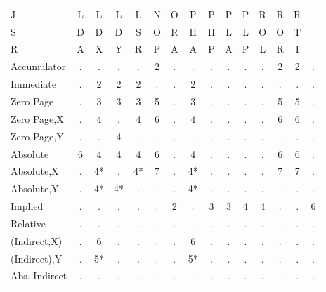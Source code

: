 \documentclass{article}
\begin{document}
  \begin{table}[H]
  \centering
  \begin{tabular}{|l|c c c c c c c c c c c c c c|}
  \hline
                  J & L & L & L & L & N & O & P & P & P & P & R & R & R\\
                  S & D & D & D & S & O & R & H & H & L & L & O & O & T\\
                  R & A & X & Y & R & P & A & A & P & A & P & L & R & I\\
  \hline
  Accumulator  &  . & . & . & . & 2 & . & . & . & . & . & . & 2 & 2 & .\\
  Immediate    &  . & 2 & 2 & 2 & . & . & 2 & . & . & . & . & . & . & .\\
  Zero Page    &  . & 3 & 3 & 3 & 5 & . & 3 & . & . & . & . & 5 & 5 & .\\
  Zero Page,X  &  . & 4 & . & 4 & 6 & . & 4 & . & . & . & . & 6 & 6 & .\\
  Zero Page,Y  &  . & . & 4 & . & . & . & . & . & . & . & . & . & . & .\\
  Absolute     &  6 & 4 & 4 & 4 & 6 & . & 4 & . & . & . & . & 6 & 6 & .\\
  Absolute,X   &  . & 4*& . & 4*& 7 & . & 4*& . & . & . & . & 7 & 7 & .\\
  Absolute,Y   &  . & 4*& 4*& . & . & . & 4*& . & . & . & . & . & . & .\\
  Implied      &  . & . & . & . & . & 2 & . & 3 & 3 & 4 & 4 & . & . & 6\\
  Relative     &  . & . & . & . & . & . & . & . & . & . & . & . & . & .\\
  (Indirect,X) &  . & 6 & . & . & . & . & 6 & . & . & . & . & . & . & .\\
  (Indirect),Y &  . & 5*& . & . & . & . & 5*& . & . & . & . & . & . & .\\
  Abs. Indirect&  . & . & . & . & . & . & . & . & . & . & . & . & . & .\\
  \hline
  \end{tabular}
  \end{table}
\end{document}
